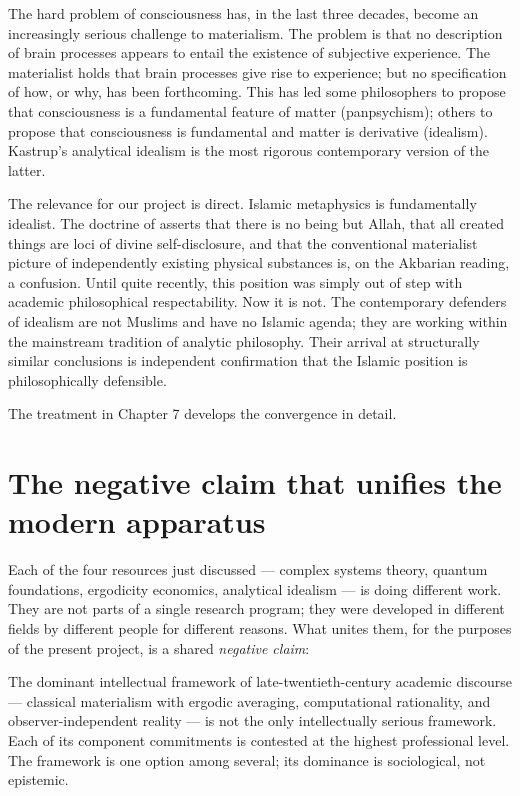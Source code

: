 The hard problem of consciousness has, in the last three decades,
become an increasingly serious challenge to materialism. The
problem is that no description of brain processes appears to entail
the existence of subjective experience. The materialist holds that
brain processes give rise to experience; but no specification of
how, or why, has been forthcoming. This has led some philosophers to
propose that consciousness is a fundamental feature of matter
(panpsychism); others to propose that consciousness is fundamental
and matter is derivative (idealism). Kastrup's analytical idealism
is the most rigorous contemporary version of the latter.

The relevance for our project is direct. Islamic metaphysics is
fundamentally idealist. The doctrine of  asserts that
there is no being but Allah, that all created things are loci of
divine self-disclosure, and that the conventional materialist picture
of independently existing physical substances is, on the Akbarian
reading, a confusion. Until quite recently, this position was simply
out of step with academic philosophical respectability. Now it is
not. The contemporary defenders of idealism are not Muslims and have
no Islamic agenda; they are working within the mainstream tradition
of analytic philosophy. Their arrival at structurally similar
conclusions is independent confirmation that the Islamic position is
philosophically defensible.

The treatment in Chapter 7 develops the convergence in detail.

\section{The negative claim that unifies the modern apparatus}
\label{sec:negative-claim}

Each of the four resources just discussed --- complex systems
theory, quantum foundations, ergodicity economics, analytical
idealism --- is doing different work. They are not parts of a
single research program; they were developed in different fields by
different people for different reasons. What unites them, for the
purposes of the present project, is a shared \emph{negative claim}:

\begin{principlebox}
The dominant intellectual framework of late-twentieth-century
academic discourse --- classical materialism with ergodic averaging,
computational rationality, and observer-independent reality --- is
not the only intellectually serious framework. Each of its
component commitments is contested at the highest professional
level. The framework is one option among several; its dominance is
sociological, not epistemic.
\end{principlebox}

